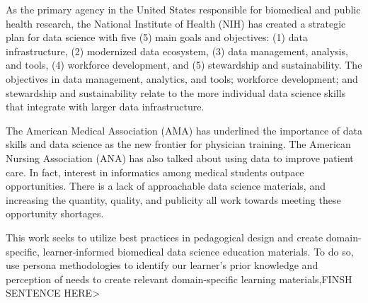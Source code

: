 \documentclass[020-persona\_validation.tex]{subfiles}
\begin{document}

    As the primary agency in the United States responsible for biomedical and public health research,
    the National Institute of Health (NIH) has created a strategic plan for data science with five (5)
    main goals and objectives:
    (1) data infrastructure,
    (2) modernized data ecosystem,
    (3) data management, analysis, and tools,
    (4) workforce development, and
    (5) stewardship and sustainability. %
    The objectives in
    data management, analytics, and tools;
    workforce development;
    and stewardship and sustainability
    relate to the more individual data science skills that integrate with larger data infrastructure.


    The American Medical Association (AMA) has underlined the importance of data skills and data science
    as the new frontier for physician training.
    The American Nursing Association (ANA) has also talked about using data to improve patient care.
    In fact, interest in informatics among medical students outpace opportunities.
    There is a lack of approachable data science materials,
    and increasing the quantity, quality, and publicity all work towards meeting these opportunity shortages.

    This work seeks to utilize best practices in pedagogical design and create domain-specific, learner-informed biomedical data science education materials. To do so,  use persona methodologies to identify our learner's prior knowledge and perception of needs
    to create relevant domain-specific learning materials,FINSH SENTENCE HERE> 
\end{document}
